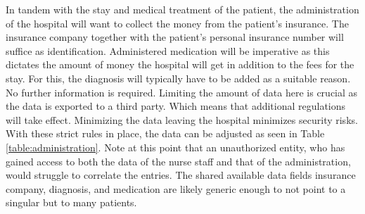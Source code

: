 In tandem with the stay and medical treatment of the patient, the administration of the hospital will want to collect the money from the patient's insurance. The insurance company together with the patient's personal insurance number will suffice as identification. 
Administered medication will be imperative as this dictates the amount of money the hospital will get in addition to the fees for the stay. For this, the diagnosis will typically have to be added as a suitable reason. No further information is required. Limiting the amount of data here 
is crucial as the data is exported to a third party. Which means that additional regulations will take effect. Minimizing the data leaving the hospital minimizes security risks. With these strict rules in place, the data can be adjusted as seen in Table \ref{table:administration}. \newline 
Note at this point that an unauthorized entity, who has gained access to both the data of the nurse staff and that of the administration, would struggle to correlate the entries. The shared available data fields insurance company, diagnosis, and medication are likely generic enough to not point to a singular but to many patients. 

\bigskip

